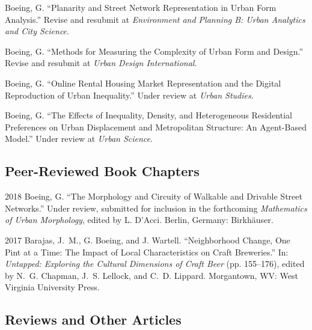 \documentclass{academiccv}
\begin{document}
\begin{tablist}

\item[\the\year] \tab Boeing, G. \enquote{Planarity and Street Network Representation in Urban Form Analysis.} Revise and resubmit at \textit{Environment and Planning B: Urban Analytics and City Science}.

\item[\the\year] \tab Boeing, G. \enquote{Methods for Measuring the Complexity of Urban Form and Design.} Revise and resubmit at \textit{Urban Design International}.

\item[\the\year] \tab Boeing, G. \enquote{Online Rental Housing Market Representation and the Digital Reproduction of Urban Inequality.} Under review at \textit{Urban Studies}.

\item[\the\year] \tab Boeing, G. \enquote{The Effects of Inequality, Density, and Heterogeneous Residential Preferences on Urban Displacement and Metropolitan Structure: An Agent-Based Model.} Under review at \textit{Urban Science}.

\end{tablist}



\subsection*{Peer-Reviewed Book Chapters}

\begin{tablist}

\item[2018] \tab Boeing, G. \enquote{The Morphology and Circuity of Walkable and Drivable Street Networks.} Under review, submitted for inclusion in the forthcoming \textit{Mathematics of Urban Morphology}, edited by L. D'Acci. Berlin, Germany: Birkhäuser.

\item[2017] \tab Barajas, J.~M., G. Boeing, and J. Wartell. \enquote{Neighborhood Change, One Pint at a Time: The Impact of Local Characteristics on Craft Breweries.} In: \textit{Untapped: Exploring the Cultural Dimensions of Craft Beer} (pp. 155--176), edited by N.~G. Chapman, J.~S. Lellock, and C.~D. Lippard. Morgantown, WV: West Virginia University Press.

\end{tablist}



\subsection*{Reviews and Other Articles}
\end{document}
